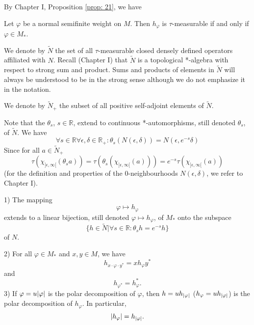 By Chapter I, Proposition \ref{prop: 21}, we have
\begin{corollary}\label{Chap2: Coro: 6}
    Let $\varphi$ be a normal semifinite weight on $M$. Then $h_\varphi$ is $\tau$-measurable if and only if $\varphi\in M_*$.
\end{corollary}
We denote by $\tilde{N}$ the set of all $\tau$-measurable closed densely defined operators affiliated with $N$. Recall (Chapter I) that $\tilde{N}$ is a topological *-algebra with respect to strong sum and product. Sums and products of elements in $\tilde{N}$ will always be understood to be
in the strong sense although we do not emphasize it in the notation.\par
We denote by $\tilde{N}_+$ the subset of all positive self-adjoint elements of $\tilde{N}$.\par
Note that the $\theta_s$, $s\in \mathbb{R}$, extend to continuous *-automorphisms, still denoted $\theta_s$, of $\tilde{N}$. We have
\begin{equation}
    \forall s\in \mathbb{R} \forall \epsilon,\delta\in \mathbb{R}_+: \theta_s(N(\epsilon,\delta))=N(\epsilon,e^{-s}\delta)
\end{equation}
Since for all $a\in \tilde{N}_+$
\[
    \tau(\chi_{]\epsilon,\infty[}(\theta_sa))=\tau(\theta_s(\chi_{]\epsilon,\infty[}(a)))=e^{-s}\tau(\chi_{]\epsilon,\infty[}(a))
\]
(for the definition and properties of the $0$-neighbourhoods $N(\epsilon,\delta)$, we refer to Chapter I).
\begin{theorem}\label{Chap2: Thm: 7}
    1) The mapping
    \[
        \varphi\mapsto h_\varphi
    \]
    extends to a linear bijection, still denoted $\varphi\mapsto h_\varphi$, of $M_*$ onto the subspace
    \begin{equation}\label{Chap2: eqn: 19}
        \{h\in \tilde{N}|\forall s\in \mathbb{R}:\theta_sh=e^{-s}h\}
    \end{equation}
    of $N$.\par
    2) For all $\varphi\in M_*$ and $x,y \in M$, we have
    \begin{equation}\label{Chap2: eqn: 20}
        h_{x\cdot \varphi \cdot y^*}=x h_\varphi y^*
    \end{equation}
    and
    \begin{equation}\label{Chap2: eqn: 21}
        h_{\varphi^*}=h_\varphi^*.
    \end{equation}
    3) If $\varphi=u\abs{\varphi}$ is the polar decomposition of $\varphi$, then $h=uh_{\abs{\varphi}}$ {\color{red} ($h_\varphi=uh_{\abs{\varphi}}$)} is the polar decomposition of $h_\varphi$. In particular,
    \begin{equation}
        \abs{h_\varphi}=h_{\abs{\varphi}}.
    \end{equation}
\end{theorem}
